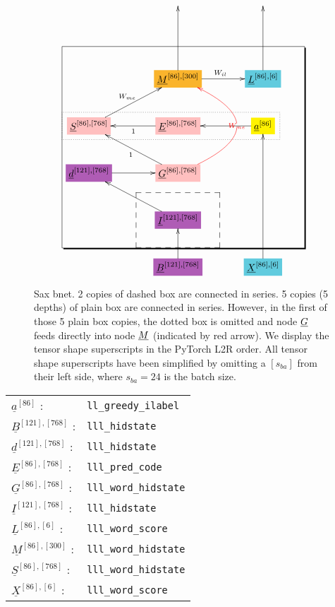 \documentclass[12pt]{article}
\begin{document}
\begin{figure}[h!]\centering
$$\xymatrix@R=2.5pc@C=3.5pc{
&&
\\
&&
\\
&*+[F*:Dandelion]{\underline{M}^{[86], [300]}}\ar[uu]\ar[r]^{W_{il}}&*+[F*:SkyBlue]{\underline{L}^{[86], [6]}}\ar[uu]
\\
*+[F*:pink]{\underline{S}^{[86], [768]}}\ar[ur]^{W_{me}}&*+[F*:pink]{\underline{E}^{[86], [768]}}\ar[l]^{1}&*+[F*:yellow]{\underline{a}^{[86]}}\ar[l]
\\
*+[F*:Orchid]{\underline{d}^{[121], [768]}}\ar[r]&*+[F*:pink]{\underline{G}^{[86], [768]}}\ar@[red]@/_5pc/[uu]|-{\color{red} W_{me}}\ar[ul]^{1}&
\\
&*+[F*:Orchid]{\underline{I}^{[121], [768]}}\ar[ul]&
\\
&*+[F*:Orchid]{\underline{B}^{[121], [768]}}\ar[u]&*+[F*:SkyBlue]{\underline{X}^{[86], [6]}}\ar[uuu]
\save
\POS"3,1"."6,1"."3,3"."6,3"!C*+<4.8em>\frm{-,}
\POS"6,2"."6,2"."6,2"."6,2"!C*+<3.8em>\frm{--}
\POS"4,1"."4,1"."4,3"."4,3"!C*+<1.0em>\frm{.}
\restore
}$$
\caption{Sax bnet. 2 copies of dashed box are connected in series. 5 copies (5 depths) of plain box are connected in series.  However, in the first of those 5 plain box copies, the dotted box  is omitted and node $\underline{G}$ feeds directly into node  $\underline{M}$ (indicated by red arrow). We display the tensor shape superscripts in the PyTorch L2R order. All tensor shape superscripts have been simplified by omitting a $[s_{ba}]$ from their left side, where $s_{ba}=24$ is the batch size. }
\label{fig-texnn-for-sentence-ax-bnet}
\end{figure}

\begin{tabular}{ll}
$\underline{a}^{[86]}$ :&{\tt ll\_greedy\_ilabel}\\
$\underline{B}^{[121], [768]}$ :&{\tt lll\_hidstate}\\
$\underline{d}^{[121], [768]}$ :&{\tt lll\_hidstate}\\
$\underline{E}^{[86], [768]}$ :&{\tt lll\_pred\_code}\\
$\underline{G}^{[86], [768]}$ :&{\tt lll\_word\_hidstate}\\
$\underline{I}^{[121], [768]}$ :&{\tt lll\_hidstate}\\
$\underline{L}^{[86], [6]}$ :&{\tt lll\_word\_score}\\
$\underline{M}^{[86], [300]}$ :&{\tt lll\_word\_hidstate}\\
$\underline{S}^{[86], [768]}$ :&{\tt lll\_word\_hidstate}\\
$\underline{X}^{[86], [6]}$ :&{\tt lll\_word\_score}
\end{tabular}
\end{document}
